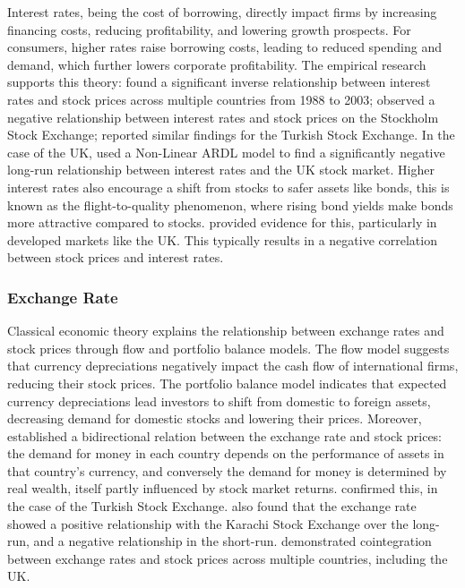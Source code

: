 \documentclass[11pt,a4paper]{article}
\newcommand{\citeboth}[1]{\citeauthor{#1} \citep{#1}}
\begin{document}
Interest rates, being the cost of borrowing, directly impact firms by increasing financing costs, reducing profitability, and lowering growth prospects. For consumers, higher rates raise borrowing costs, leading to reduced spending and demand, which further lowers corporate profitability. 
The empirical research supports this theory: \citeboth{alam2009} found a significant inverse relationship between interest rates and stock prices across multiple countries from 1988 to 2003; 
\citeboth{talla2013} observed a negative relationship between interest rates and stock prices on the Stockholm Stock Exchange; 
\citeboth{demir2019} reported similar findings for the Turkish Stock Exchange. In the case of the UK, \citeboth{neifar2023} used a Non-Linear ARDL model to find a significantly negative long-run relationship between interest rates and the UK stock market. Higher interest rates also encourage a shift from stocks to safer 
assets like bonds, this is known as the flight-to-quality phenomenon, where rising bond yields make bonds more attractive compared to stocks. \citeboth{asgharian2016} provided evidence for this, particularly in developed markets like the UK. This typically results in a negative correlation between stock prices and interest rates.

\subsubsection{Exchange Rate}

Classical economic theory explains the relationship between exchange rates and stock prices through flow and portfolio balance models. The flow model suggests that currency depreciations negatively impact the cash flow of international firms, reducing their stock prices. The portfolio balance model indicates that expected currency depreciations lead investors to shift from domestic to foreign assets, decreasing demand for domestic stocks and lowering their prices. 
Moreover, \citeboth{branson1977} established a bidirectional relation between the exchange rate and stock prices: the demand for money in each country depends on the performance of assets in that country’s currency, and conversely the demand for money is determined by real wealth, itself partly influenced by stock market returns. 
\citeboth{aydemir2009} confirmed this, in the case of the Turkish Stock Exchange. 
\citeboth{khan2018} also found that the exchange rate showed a positive relationship with the Karachi Stock Exchange over the long-run, and a negative relationship in the short-run. 
\citeboth{wong2022} demonstrated cointegration between exchange rates and stock prices across multiple countries, including the UK.
\end{document}
